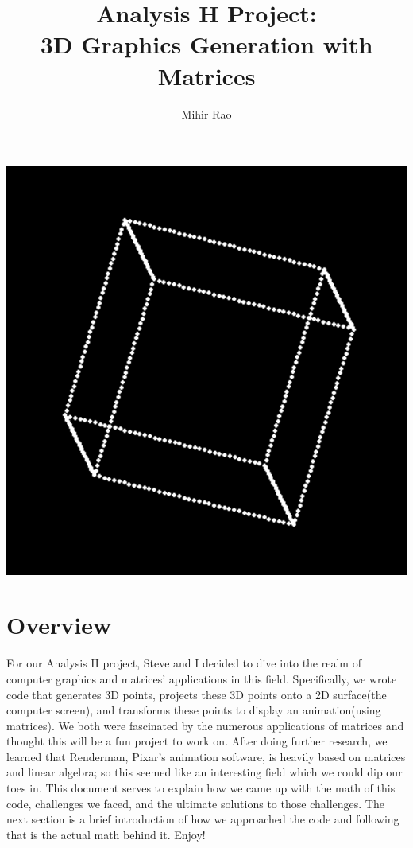 \documentclass[14pt]{article}
\begin{document}
\title{Analysis H Project: \\ \textbf{3D Graphics Generation with Matrices}}
\author{Mihir Rao}
\maketitle

\begin{center}
	\vspace{3em}
	\includegraphics[scale=0.8]{titleImg}
	\vspace{3em}
\end{center}

\section*{Overview}

For our Analysis H project, Steve and I decided to dive into the realm of computer graphics and matrices' applications in this field. Specifically, we wrote code that generates 3D points, projects these 3D points onto a 2D surface(the computer screen), and transforms these points to display an animation(using matrices). We both were fascinated by the numerous applications of matrices and thought this will be a fun project to work on. After doing further research, we learned that Renderman, Pixar's animation software, is heavily based on matrices and linear algebra; so this seemed like an interesting field which we could dip our toes in. This document serves to explain how we came up with the math of this code, challenges we faced, and the ultimate solutions to those challenges. The next section is a brief introduction of how we approached the code and following that is the actual math behind it. Enjoy!
\end{document}

